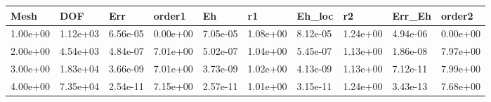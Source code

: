 \begin{tabular}{llllllllll}
Mesh & DOF & Err & order1 & Eh & r1 & Eh_loc & r2 & Err_Eh & order2 \\ 
\hline 
1.00e+00 & 1.12e+03 & 6.56e-05 & 0.00e+00 & 7.05e-05 & 1.08e+00 & 8.12e-05 & 1.24e+00 & 4.94e-06 & 0.00e+00 \\ 
2.00e+00 & 4.54e+03 & 4.84e-07 & 7.01e+00 & 5.02e-07 & 1.04e+00 & 5.45e-07 & 1.13e+00 & 1.86e-08 & 7.97e+00 \\ 
3.00e+00 & 1.83e+04 & 3.66e-09 & 7.01e+00 & 3.73e-09 & 1.02e+00 & 4.13e-09 & 1.13e+00 & 7.12e-11 & 7.99e+00 \\ 
4.00e+00 & 7.35e+04 & 2.54e-11 & 7.15e+00 & 2.57e-11 & 1.01e+00 & 3.15e-11 & 1.24e+00 & 3.43e-13 & 7.68e+00 \\ 
\hline 
\end{tabular}